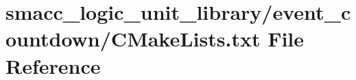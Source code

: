 \hypertarget{logic__unit__library_2event__countdown_2CMakeLists_8txt}{}\section{smacc\+\_\+logic\+\_\+unit\+\_\+library/event\+\_\+countdown/\+C\+Make\+Lists.txt File Reference}
\label{logic__unit__library_2event__countdown_2CMakeLists_8txt}

